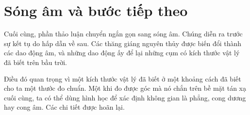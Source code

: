 \section{Sóng âm và bước tiếp theo}

Cuối cùng, phần thảo luận chuyển ngắn gọn sang sóng âm. Chúng diễn ra trước sự kết tụ do hấp dẫn về sau. Các thăng giáng nguyên thủy được biến đổi thành các dao động âm, và những dao động ấy để lại những cụm có kích thước vật lý đã biết trên bầu trời.

Điều đó quan trọng vì một kích thước vật lý đã biết ở một khoảng cách đã biết cho ta một thước đo chuẩn. Một khi đo được góc mà nó chắn trên bề mặt tán xạ cuối cùng, ta có thể dùng hình học để xác định không gian là phẳng, cong dương hay cong âm. Các chi tiết được hoãn lại.

\begin{classroomqa}
\end{classroomqa}